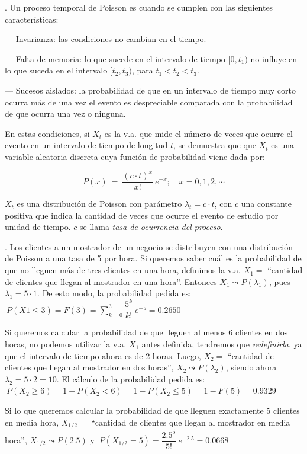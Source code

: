 \vspace{4mm}
\begin{definition}
.	Un proceso temporal de Poisson es cuando se cumplen con las siguientes características:

\vspace{2mm}
--- Invarianza: las condiciones no cambian en el tiempo.

--- Falta de memoria: lo que sucede en el intervalo de tiempo $[0, t_1)$ no influye en lo que suceda en el intervalo $[t_2, t_3)$, para $t_1<t_2<t_3$.

--- Sucesos aislados: la probabilidad de que en un intervalo de tiempo muy corto ocurra más de una vez el evento es despreciable comparada con la probabilidad de que ocurra una vez o ninguna.	

\vspace{4mm}

En estas condiciones, si $X_t$ es la v.a. que mide el número de veces que ocurre el evento en un intervalo de tiempo de longitud $t$, se demuestra que que $X_t$ es una variable aleatoria discreta cuya función de probabilidad viene dada por:

$$P(x)\ =\ \dfrac{(c\cdot t)^x}{x!}\ e^{-x};\quad x=0,1,2,\cdots $$

$X_t$ es una distribución de Poisson con parámetro $\lambda_t = c \cdot t$, con $c$  una constante positiva que indica la cantidad de veces que ocurre el evento de estudio por unidad de tiempo. $c$ se llama \emph{tasa de ocurrencia del proceso}.
\end{definition}

\vspace{4mm}
\begin{example}
.	Los clientes a un mostrador de un negocio se distribuyen con una distribución de Poisson a una tasa de 5 por hora. Si queremos saber cuál es la probabilidad de que no lleguen más de tres clientes en una hora, definimos la v.a. $X_1 =$ ``cantidad de clientes que llegan al mostrador en una hora''. Entonces $X_1 \leadsto  P(\lambda_1)$, pues $\lambda_1 = 5 \cdot 1$. De esto modo, la probabilidad pedida es:
$\ P(X1 \le  3) = F(3) = \displaystyle \sum_{k=0}^3  \dfrac {5^k} {k!} \ e^{-5}= 0.2650$ 

\vspace{2mm} Si queremos calcular la probabilidad de que lleguen al menos 6 clientes en dos horas, no podemos utilizar la v.a. $X_1$ antes definida, tendremos que \emph{redefinirla}, ya que el intervalo de tiempo ahora es de 2 horas. Luego, $X_2 =$ ``cantidad de clientes que llegan al mostrador en dos horas'', $X_2 \leadsto P (\lambda_2)$, siendo ahora $\lambda_2 = 5 \cdot 2 = 10$. El cálculo de la probabilidad pedida es:
$\ P(X_2 \ge 6)=1-P(X_2<6)=1-P(X_2 \le 5)=1-F(5)=0.9329$ 

\vspace{2mm}  Si lo que queremos calcular la probabilidad de que lleguen exactamente 5 clientes en media hora, $X_{1/2} =$ ``cantidad de clientes que llegan al mostrador en media hora'', $X_{1/2} \leadsto P (2.5)$ y 
$\ P(X_{1/2}=5)=\dfrac{2.5^5}{5!}\ e^{-2.5} =0.0668$
\end{example}

